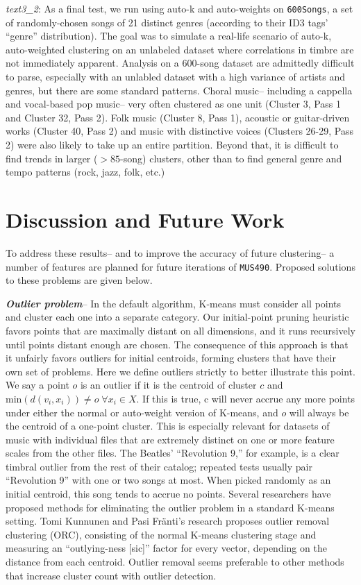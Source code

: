\documentclass[12pt,twocolumn,titlepage]{article}
\begin{document}
\emph{text3\_2}: As a final test, we run using auto-k and auto-weights on \texttt{600Songs}, a set of randomly-chosen songs of 21 distinct genres (according to their ID3 tags' ``genre'' distribution). The goal was to simulate a real-life scenario of auto-k, auto-weighted clustering on an unlabeled dataset where correlations in timbre are not immediately apparent. Analysis on a 600-song dataset are admittedly difficult to parse, especially with an unlabled dataset with a high variance of artists and genres, but there are some standard patterns. Choral music-- including a cappella and vocal-based pop music-- very often clustered as one unit (Cluster 3, Pass 1 and Cluster 32, Pass 2). Folk music (Cluster 8, Pass 1), acoustic or guitar-driven works (Cluster 40, Pass 2) and music with distinctive voices (Clusters 26-29, Pass 2) were also likely to take up an entire partition. Beyond that, it is difficult to find trends in larger ($>85$-song) clusters, other than to find general genre and tempo patterns (rock, jazz, folk, etc.)


\section{Discussion and Future Work}
\label{sec:future}

	
To address these results-- and to improve the accuracy of future clustering-- a number of features are planned for future iterations of \texttt{MUS490}. Proposed solutions to these problems are given below.

\emph{\textbf{Outlier problem}}-- In the default algorithm, K-means must consider all points and cluster each one into a separate category. Our initial-point pruning heuristic favors points that are maximally distant on all dimensions, and it runs recursively until points distant enough are chosen. The consequence of this approach is that it unfairly favors outliers for initial centroids, forming clusters that have their own set of problems. Here we define outliers strictly to better illustrate this point. We say a point $o$ is an outlier if it is the centroid of cluster $c$ and $\mathrm{min}(d(v_i, x_i)) \neq o \; \forall x_i \in X$. If this is true, c will never accrue any more points under either the normal or auto-weight version of K-means, and $o$ will always be the centroid of a one-point cluster. This is especially relevant for datasets of music with individual files that are extremely distinct on one or more feature scales from the other files. The Beatles' ``Revolution 9,'' for example, is a clear timbral outlier from the rest of their catalog; repeated tests usually pair ``Revolution 9'' with one or two songs at most. When picked randomly as an initial centroid, this song tends to accrue no points.
Several researchers have proposed methods for eliminating the outlier problem in a standard K-means setting. Tomi Kunnunen and Pasi Fr\"{a}nti's research proposes outlier removal clustering (ORC), consisting of the normal K-means clustering stage and measuring an ``outlying-ness [sic]'' factor for every vector, depending on the distance from each centroid. \cite{OutlierRemoval} \cite{Marghny} Outlier removal seems preferable to other methods that increase cluster count with outlier detection. 
\end{document}
